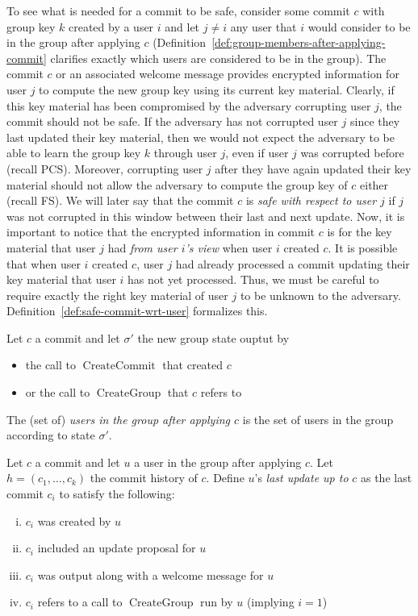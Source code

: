 To see what is needed for a commit to be safe, consider some commit $c$ with group key $k$ created by a user $i$ and let $j \neq i$ any user that $i$ would consider to be in the group after applying $c$ (Definition~\ref{def:group-members-after-applying-commit} clarifies exactly which users are considered to be in the group). The commit $c$ or an associated welcome message provides encrypted information for user $j$ to compute the new group key using its current key material. Clearly, if this key material has been compromised by the adversary corrupting user $j$, the commit should not be safe. If the adversary has not corrupted user $j$ since they last updated their key material, then we would not expect the adversary to be able to learn the group key $k$ through user $j$, even if user $j$ was corrupted before (recall PCS).
Moreover, corrupting user $j$ after they have again updated their key material should not allow the adversary to compute the group key of $c$ either (recall FS). We will later say that the commit $c$ is \emph{safe with respect to user $j$} if $j$ was not corrupted in this window between their last and next update.
Now, it is important to notice that the encrypted information in commit $c$ is for the key material that user $j$ had \emph{from user $i$'s view} when user $i$ created $c$. It is possible that when user $i$ created $c$, user $j$ had already processed a commit updating their key material that user $i$ has not yet processed. Thus, we must be careful to require exactly the right key material of user $j$ to be unknown to the adversary. Definition~\vref{def:safe-commit-wrt-user} formalizes this.

\begin{definition} \label{def:group-members-after-applying-commit}
	Let $c$ a commit and let $\sigma'$ the new group state ouptut by
	\begin{itemize}
		\item the call to $\operatorname{CreateCommit}$ that created $c$
		\item or the call to $\operatorname{CreateGroup}$ that $c$ refers to
	\end{itemize}
	The (set of) \emph{users in the group after applying $c$} is the set of users in the group according to state $\sigma'$.
\end{definition}


\begin{definition} \label{def:last-update-before-commit}
	Let $c$ a commit and let $u$ a user in the group after applying $c$. Let $h = (c_1, \ldots, c_k)$ the commit history of $c$. Define $u$'s \emph{last update up to} $c$ as the last commit $c_i$ to satisfy the following:
	\begin{enumerate}[(i)]
		\item $c_i$ was created by $u$
		\item $c_i$ included an update proposal for $u$
		\item $c_i$ was output along with a welcome message for $u$
		\item $c_i$ refers to a call to $\operatorname{CreateGroup}$ run by $u$ (implying $i = 1$)
	\end{enumerate}
\end{definition}

